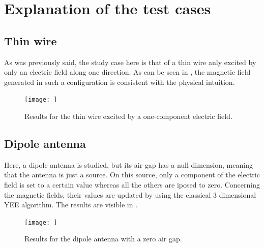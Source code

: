 \documentclass[12 pt]{report}
\begin{document}
\section{Explanation of the test cases}
\subsection{Thin wire}
As was previously said, the study case here is that of a thin wire anly excited by only an electric field along one direction. As can be seen in , the magnetic field generated in such a configuration is consistent with the physical intuition.
%
\begin{figure}
	\centering
	\texttt{[image: ]}
	\caption{Results for the thin wire excited by a one-component electric field.}
	\label{fig:THINWIRE}
\end{figure}
%


\subsection{Dipole antenna}
Here, a dipole antenna is studied, but its air gap has a null dimension, meaning that the antenna is just a source. On this source, only a component of the electric field is set to a certain value whereas all the others are iposed to zero. Concerning the magnetic fields, their values are updated by using the classical 3 dimensional YEE algorithm. The results are visible in .
%
\begin{figure}
	\centering
	\texttt{[image: ]}
	\caption{Results for the dipole antenna with a zero air gap.}
	\label{fig:DIPOLEANTENNA}
\end{figure}
%
\end{document}
